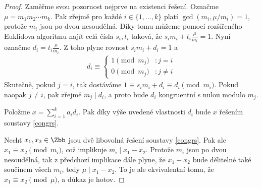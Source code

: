 \begin{proof}
Zaměřme svou pozornost nejprve na existenci řešení. Označme
$ \mu = m_1 m_2 \cdots m_k $. Pak zřejmě pro každé $ i \in \{1,\dots,k\} $
platí $ \gcd(m_i, \mu / m_i) = 1 $, protože $ m_i $ jsou po dvou nesoudělná.
Díky tomu můžeme pomocí rozšířeného Euklidova algoritmu najít celá čísla
$ s_i, t_i $ taková, že $ s_i m_i + t_i \frac{\mu}{m_i} = 1 $. Nyní označme
$ d_i = t_i \frac{\mu}{m_i} $. Z toho plyne rovnost $ s_i m_i + d_i = 1 $ a
\begin{align*}
d_i \equiv
\left\{
  \begin{array}{lr}
    1 \pmod{ m_j } & : j = i \\
    0 \pmod{ m_j }  & : j \neq i
  \end{array}
\right.
\end{align*}
Skutečně, pokud $ j = i $, tak dostáváme
$ 1 \equiv s_i m_i + d_i \equiv d_i \pmod{m_i} $. Pokud naopak $ j \neq i $, pak
zřejmě $ m_j \mid d_i $, a proto bude $ d_i $ kongruentní s nulou modulo $ m_j $.

Položme $ x = \sum\limits_{i = 1}^{k} a_i d_i $. Pak díky výše uvedené
vlastnosti $ d_i $ bude $ x $ řešením soustavy \eqref{congrs}.

Nechť $ x_1, x_2 \in \Zbb $ jsou dvě libovolná řešení soustavy \eqref{congrs}.
Pak ale $ x_1 \equiv x_2 \pmod{m_i} $, což implikuje $ m_i \mid x_1 - x_2 $.
Protože $ m_i $ jsou po dvou nesoudělná, tak z předchozí implikace dále plyne, že
$ x_1 - x_2 $ bude dělitelné také součinem všech $ m_i $, tedy
$ \mu \mid x_1 - x_2 $. To je ale ekvivalentní tomu, že
$ x_1 \equiv x_2 \pmod{\mu} $, a důkaz je hotov.
\end{proof}

